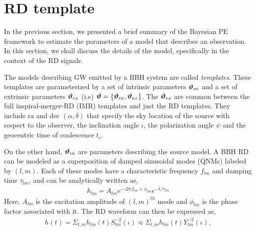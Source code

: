 


\section{RD template}
\label{sec:RD-template}
In the previous section, we presented a brief summary of the Bayesian PE framework to estimate the parameters of a model that describes an observation. In this section, we shall discuss the details of the model, specifically in the context of the RD signals. 

The models describing GW emitted by a BBH system are called \textit{templates}. These templates are parameterized by a set of intrinsic parameters $\boldsymbol{\vartheta}_{in}$  and a set of extrinsic parameters $\boldsymbol{\vartheta}_{ex}$ (i.e) $\boldsymbol{\vartheta} = \left\lbrace \boldsymbol{\vartheta}_{in}, \boldsymbol{\vartheta}_{ex} \right\rbrace$. The $\boldsymbol{\vartheta}_{ex}$ are common between the full inspiral-merger-RD (IMR) templates and just the RD templates. They include ra and dec $(\alpha, \delta)$ that specify the sky location of the source with respect to the observer, the inclination angle $\iota$, the polarization angle $\psi$ and the geocentric time of coalescence $t_{c}$.     

On the other hand, $\boldsymbol{\vartheta}_{in}$ are parameters describing the source model. A BBH RD can be modeled as a superposition of damped sinusoidal modes (QNMs) labeled by $(l,m)$. Each of these modes have a characteristic frequency $f_{lm}$ and damping time $\tau_{lm}$, and can be analytically written as, 
\begin{align}
h_{lm}=A_{lm}e^{-\iota 2 \pi f_{lm} + \phi_{lm}} e^{-t/\tau_{lm}}
\end{align}
Here, $A_{lm}$ is the excitation amplitude of $(l,m)^{th}$ mode and $\phi_{lm}$ is the phase factor associated with it.
The RD waveform can then be expressed as, 
\begin{align}
h(t)= \Sigma_{l, m} h_{lm}(t) S_{lm}^{-2}(\iota) \approx \Sigma_{l, m} h_{lm}(t) Y_{lm}^{-2}(\iota), 
\end{align}


